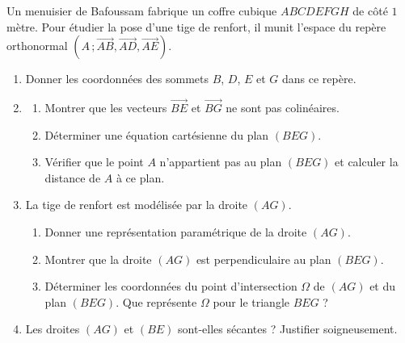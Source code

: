 \documentclass[11pt]{article}
\begin{document}
\begin{exercice}
Un menuisier de Bafoussam fabrique un coffre cubique $ABCDEFGH$ de côté $1$ mètre. Pour étudier la pose d'une tige de renfort, il munit l'espace du repère orthonormal $(A\,;\overrightarrow{AB},\overrightarrow{AD},\overrightarrow{AE})$.
\begin{enumerate}
\item Donner les coordonnées des sommets $B$, $D$, $E$ et $G$ dans ce repère.
\item \begin{enumerate}
\item Montrer que les vecteurs $\overrightarrow{BE}$ et $\overrightarrow{BG}$ ne sont pas colinéaires.
\item Déterminer une équation cartésienne du plan $(BEG)$.
\item Vérifier que le point $A$ n'appartient pas au plan $(BEG)$ et calculer la distance de $A$ à ce plan.
\end{enumerate}
\item La tige de renfort est modélisée par la droite $(AG)$.
\begin{enumerate}
\item Donner une représentation paramétrique de la droite $(AG)$.
\item Montrer que la droite $(AG)$ est perpendiculaire au plan $(BEG)$.
\item Déterminer les coordonnées du point d'intersection $\Omega$ de $(AG)$ et du plan $(BEG)$. Que représente $\Omega$ pour le triangle $BEG$ ?
\end{enumerate}
\item Les droites $(AG)$ et $(BE)$ sont-elles sécantes ? Justifier soigneusement.
\end{enumerate}
\end{exercice}
\end{document}
